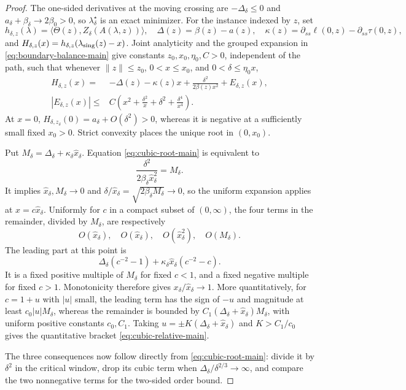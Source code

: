 \begin{proof}
The one-sided derivatives at the moving crossing are
\(-\Delta_\delta\le0\) and
\(a_\delta+\beta_\delta\to2\beta_0>0\), so
\(\lambda_\delta^\star\) is an exact minimizer.  For the instance indexed by
\(z\), set
\[
 h_{\delta,z}(\lambda)
 =\langle\Theta(z),Z_\delta(A(\lambda,z))\rangle,
 \quad
 \Delta(z)=\beta(z)-a(z),
 \quad
 \kappa(z)=\partial_{ss}\ell(0,z)-\partial_{ss}\tau(0,z),
\]
and \(H_{\delta,z}(x)=h_{\delta,z}(\lambda_{\rm sing}(z)-x)\).  Joint
analyticity and the grouped expansion in \eqref{eq:boundary-balance-main}
give constants \(z_0,x_0,\eta_0,C>0\), independent of the path, such that
whenever \(\|z\|\le z_0\), \(0<x\le x_0\), and
\(0<\delta\le\eta_0x\),
\begin{align}
 H_{\delta,z}(x)
 ={}&-\Delta(z)-\kappa(z)x
 +\frac{\delta^2}{2\beta(z)x^2}+E_{\delta,z}(x),
 \label{eq:crossover-functional-main}\\[-0.2em]
 |E_{\delta,z}(x)|
 \le{}&C\left(x^2+\frac{\delta^2}{x}
                    +\delta^2+\frac{\delta^4}{x^4}\right).
 \label{eq:crossover-remainder-main}
\end{align}
At \(x=0\), \(H_{\delta,z_\delta}(0)=a_\delta+O(\delta^2)>0\), whereas
it is negative at a sufficiently small fixed \(x_0>0\).  Strict convexity
places the unique root in \((0,x_0)\).

Put
\(M_\delta=\Delta_\delta+\kappa_\delta\widehat x_\delta\).  Equation
\eqref{eq:cubic-root-main} is equivalent to
\[
 \frac{\delta^2}{2\beta_\delta\widehat x_\delta^2}=M_\delta.
\]
It implies \(\widehat x_\delta,M_\delta\to0\) and
\(\delta/\widehat x_\delta=\sqrt{2\beta_\delta M_\delta}\to0\), so the
uniform expansion applies at \(x=c\widehat x_\delta\).  Uniformly for \(c\)
in a compact subset of \((0,\infty)\), the four terms in the remainder,
divided by \(M_\delta\), are respectively
\[
 O(\widehat x_\delta),\quad O(\widehat x_\delta),\quad
 O(\widehat x_\delta^2),\quad O(M_\delta).
\]
The leading part at this point is
\[
 \Delta_\delta(c^{-2}-1)
 +\kappa_\delta\widehat x_\delta(c^{-2}-c).
\]
It is a fixed positive multiple of \(M_\delta\) for fixed \(c<1\), and a
fixed negative multiple for fixed \(c>1\).  Monotonicity therefore gives
\(x_\delta/\widehat x_\delta\to1\).  More quantitatively, for
\(c=1+u\) with \(|u|\) small, the leading term has the sign of \(-u\) and
magnitude at least \(c_0|u|M_\delta\), whereas the remainder is bounded by
\(C_1(\Delta_\delta+\widehat x_\delta)M_\delta\), with uniform positive
constants \(c_0,C_1\).  Taking
\(u=\pm K(\Delta_\delta+\widehat x_\delta)\) and
\(K>C_1/c_0\) gives the quantitative bracket
\eqref{eq:cubic-relative-main}.

The three consequences now follow directly from
\eqref{eq:cubic-root-main}: divide it by \(\delta^2\) in the critical window,
drop its cubic term when \(\Delta_\delta/\delta^{2/3}\to\infty\), and compare
the two nonnegative terms for the two-sided order bound.
\end{proof}

